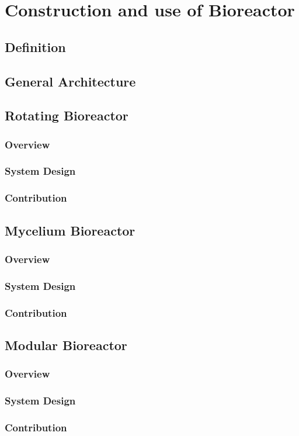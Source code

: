 \chapter{Construction and use of Bioreactor}


\section{Definition}


\section{General Architecture}


\section{Rotating Bioreactor}

\subsection{Overview}
\subsection{System Design}
\subsection{Contribution}


\section{Mycelium Bioreactor}

\subsection{Overview}
\subsection{System Design}
\subsection{Contribution}

\section{Modular Bioreactor}

\subsection{Overview}
\subsection{System Design}
\subsection{Contribution}


